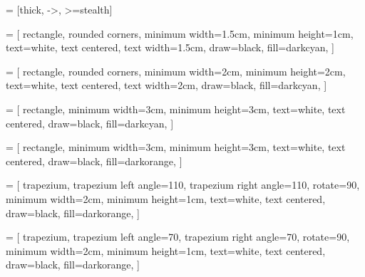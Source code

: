 




\newcommand{\ctext}[1]{\raise0.2ex\hbox{\textcircled{\scriptsize{#1}}}}


\newcommand{\unitis}[1]{%
	\text{〔\si{#1}〕}
	}




 = [thick, ->, >=stealth]

 = [
	rectangle,
	rounded corners,
	minimum width=1.5cm,
	minimum height=1cm,
	text=white,
	text centered,
	text width=1.5cm,
	draw=black,
	fill=darkcyan,
	]

 = [
	rectangle,
	rounded corners,
	minimum width=2cm,
	minimum height=2cm,
	text=white,
	text centered,
	text width=2cm,
	draw=black,
	fill=darkcyan,
	]

 = [
	rectangle,
	minimum width=3cm,
	minimum height=3cm,
	text=white,
	text centered,
	draw=black,
	fill=darkcyan,
	]

 = [
	rectangle,
	minimum width=3cm,
	minimum height=3cm,
	text=white,
	text centered,
	draw=black,
	fill=darkorange,
	]

 = [
	trapezium,
	trapezium left angle=110,
	trapezium right angle=110,
	rotate=90,
	minimum width=2cm,
	minimum height=1cm,
	text=white,
	text centered,
	draw=black,
	fill=darkorange,
	]

 = [
	trapezium,
	trapezium left angle=70,
	trapezium right angle=70,
	rotate=90,
	minimum width=2cm,
	minimum height=1cm,
	text=white,
	text centered,
	draw=black,
	fill=darkorange,
	]

